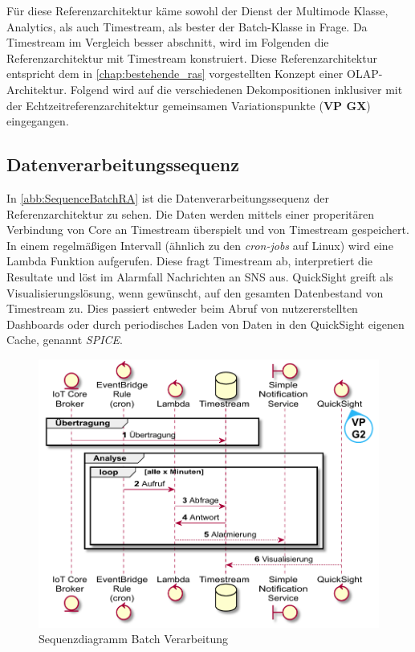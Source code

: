 Für diese Referenzarchitektur käme sowohl der Dienst der Multimode Klasse, \AWSIOT{} Analytics, als auch Timestream, als bester der Batch-Klasse in Frage. Da Timestream im Vergleich besser abschnitt, wird im Folgenden die Referenzarchitektur mit Timestream konstruiert.
Diese Referenzarchitektur entspricht dem in \autoref{chap:bestehende_ras} vorgestellten Konzept einer \ac{OLAP}-Architektur. Folgend wird auf die verschiedenen Dekompositionen inklusiver mit der Echtzeitreferenzarchitektur gemeinsamen Variationspunkte (\textbf{VP GX}) eingegangen.

\subsection{Datenverarbeitungssequenz}\label{subsection:Datenverarbeitungssequen-B}
In \autoref{abb:SequenceBatchRA} ist die Datenverarbeitungssequenz der Referenzarchitektur zu sehen. Die Daten werden mittels einer properitären Verbindung von \AWSIOT{} Core an Timestream überspielt und von Timestream gespeichert. In einem regelmäßigen Intervall (ähnlich zu den \textit{cron-jobs} auf Linux) wird eine Lambda Funktion aufgerufen. Diese fragt Timestream ab, interpretiert die Resultate und löst im Alarmfall Nachrichten an \ac{SNS} aus. QuickSight greift als Visualisierungslösung, wenn gewünscht, auf den gesamten Datenbestand von Timestream zu. Dies passiert entweder beim Abruf von nutzererstellten Dashboards oder durch periodisches Laden von Daten in den QuickSight eigenen Cache, genannt \textit{SPICE}.
\begin{figure}[H]
\centering
\includegraphics[height=0.38\textheight]{graphics/batch-ra.pdf}
\caption{Sequenzdiagramm Batch Verarbeitung}
\label{abb:SequenceBatchRA}
\end{figure}

